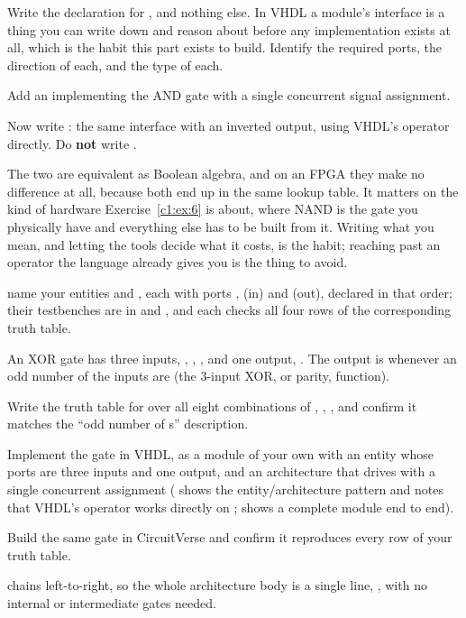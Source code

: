 \begin{parts}
  \item Write the  declaration for , and nothing else. In VHDL a
    module's interface is a thing you can write down and reason about before any implementation
    exists at all, which is the habit this part exists to build. Identify the required ports, the
    direction of each, and the type of each.
  \item Add an  implementing the AND gate with a single concurrent signal
    assignment.
  \item Now write : the same interface with an inverted output, using VHDL's
     operator directly. Do \textbf{not} write .
\end{parts}
The two are equivalent as Boolean algebra, and on an FPGA they make no difference at all, because
both end up in the same lookup table. It matters on the kind of hardware Exercise~\ref{c1:ex:6} is
about, where NAND is the gate you physically have and everything else has to be built from it.
Writing what you mean, and letting the tools decide what it costs, is the habit; reaching past an
operator the language already gives you is the thing to avoid.


\selfcheck name your entities  and , each with ports ,
 (in) and  (out), declared in that order; their testbenches are in
 and , and each checks all four rows of the
corresponding truth table.

\label{c1:ex:3}
An XOR gate has three inputs, , , , and one output, . The output is
 whenever an odd number of the inputs are  (the 3-input XOR, or parity, function).

\begin{parts}
  \item Write the truth table for  over all eight combinations of , ,
    , and confirm it matches the ``odd number of s'' description.
  \item Implement the gate in VHDL, as a module of your own with an entity whose ports are three
     inputs and one  output, and an architecture that drives
     with a single concurrent assignment ( shows the entity/architecture
    pattern and notes that VHDL's  operator works directly on ;
     shows a complete module end to end).
  \item Build the same gate in CircuitVerse and confirm it reproduces every row of your truth
    table.
\end{parts}
\note[Tip]  chains left-to-right, so the whole architecture body is a single line,
, with no internal  or intermediate gates needed.

